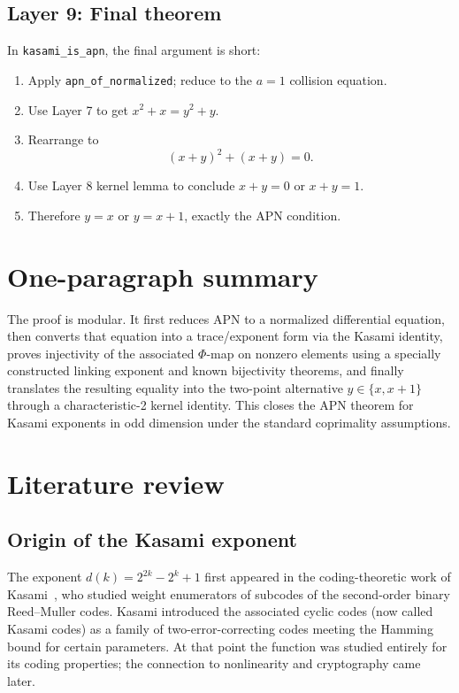 \documentclass[11pt]{article}
\begin{document}
\subsection*{Layer 9: Final theorem}
In \texttt{kasami\_is\_apn}, the final argument is short:
\begin{enumerate}
  \item Apply \texttt{apn\_of\_normalized}; reduce to the $a=1$ collision equation.
  \item Use Layer 7 to get $x^2+x=y^2+y$.
  \item Rearrange to
  \[
    (x+y)^2+(x+y)=0.
  \]
  \item Use Layer 8 kernel lemma to conclude $x+y=0$ or $x+y=1$.
  \item Therefore $y=x$ or $y=x+1$, exactly the APN condition.
\end{enumerate}

\section{One-paragraph summary}
The proof is modular. It first reduces APN to a normalized differential equation, then converts that equation into a trace/exponent form via the Kasami identity, proves injectivity of the associated $\Phi$-map on nonzero elements using a specially constructed linking exponent and known bijectivity theorems, and finally translates the resulting equality into the two-point alternative $y\in\{x,x+1\}$ through a characteristic-2 kernel identity. This closes the APN theorem for Kasami exponents in odd dimension under the standard coprimality assumptions.

\section{Literature review}

\subsection{Origin of the Kasami exponent}
The exponent $d(k)=2^{2k}-2^k+1$ first appeared in the coding-theoretic work of
Kasami~\cite{Kasami1971}, who studied weight enumerators of subcodes of the second-order
binary Reed--Muller codes. Kasami introduced the associated cyclic codes (now called Kasami
codes) as a family of two-error-correcting codes meeting the Hamming bound for certain
parameters. At that point the function was studied entirely for its coding properties; the
connection to nonlinearity and cryptography came later.
\end{document}
